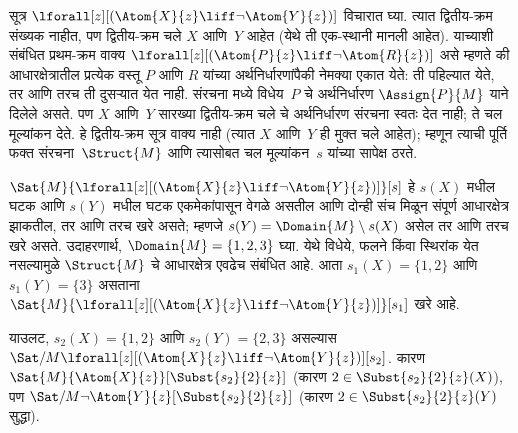 \begin{ex}
  सूत्र
  $\lforall[z][(\Atom{X}{z} \liff \lnot
    \Atom{Y}{z})]$
  विचारात घ्या.
  त्यात द्वितीय-क्रम
  संख्यक नाहीत,
  पण द्वितीय-क्रम
  चले
  $X$ आणि~$Y$
  आहेत (येथे ती
  एक-स्थानी मानली
  आहेत).
  याच्याशी संबंधित
  प्रथम-क्रम
  वाक्य
  $\lforall[z][(\Atom{P}{z} \liff \lnot \Atom{R}{z})]$
  असे म्हणते की
  आधारक्षेत्रातील प्रत्येक वस्तू
  $P$ आणि $R$ यांच्या
  अर्थनिर्धारणांपैकी नेमक्या एकात येते:
  ती पहिल्यात येते, तर आणि तरच
  ती दुसऱ्यात येत नाही.
  संरचना
  मध्ये
  विधेय~$P$
  चे अर्थनिर्धारण
  $\Assign{P}{M}$
  याने दिलेले
  असते. पण
  $X$ आणि~$Y$
  सारख्या द्वितीय-क्रम
  चले
  चे अर्थनिर्धारण
  संरचना
  स्वतः देत नाही;
  ते चल
  मूल्यांकन देते.
  हे द्वितीय-क्रम
  सूत्र
  वाक्य
  नाही (त्यात
  $X$ आणि~$Y$
  ही मुक्त
  चले
  आहेत);
  म्हणून त्याची
  पूर्ति फक्त
  संरचना~$\Struct{M}$
  आणि त्यासोबत
  चल
  मूल्यांकन~$s$
  यांच्या सापेक्ष
  ठरते.

  $\Sat{M}{\lforall[z][(\Atom{X}{z} \liff \lnot \Atom{Y}{z})]}[s]$
  हे $s(X)$ मधील
  घटक आणि $s(Y)$ मधील
  घटक एकमेकांपासून वेगळे असतील
  आणि दोन्ही संच मिळून संपूर्ण आधारक्षेत्र झाकतील,
  तर आणि तरच खरे असते; म्हणजे
  $s(Y) = \Domain{M} \setminus s(X)$
  असेल तर आणि
  तरच खरे असते.
  उदाहरणार्थ,
  $\Domain{M} = \{1, 2, 3\}$
  घ्या.
  येथे विधेये,
  फलने
  किंवा स्थिरांक
  येत नसल्यामुळे
  $\Struct{M}$
  चे आधारक्षेत्र
  एवढेच संबंधित
  आहे.
  आता
  $s_1(X) = \{1, 2\}$
  आणि
  $s_1(Y) = \{3\}$
  असताना
  $\Sat{M}{\lforall[z][(\Atom{X}{z}
      \liff \lnot \Atom{Y}{z})]}[s_1]$
  खरे आहे.

  याउलट,
  $s_2(X) = \{1, 2\}$
  आणि
  $s_2(Y) = \{2, 3\}$
  असल्यास
  $\Sat/{M}{\lforall[z][(\Atom{X}{z} \liff \lnot
      \Atom{Y}{z})]}[s_2]$.
  कारण
  $\Sat{M}{\Atom{X}{z}}[\Subst{s_2}{2}{z}]$
  (कारण
  $2 \in \Subst{s_2}{2}{z}(X)$),
  पण
  $\Sat/{M}{\lnot \Atom{Y}{z}}[\Subst{s_2}{2}{z}]$
  (कारण
  $2 \in
  \Subst{s_2}{2}{z}(Y)$
  सुद्धा).
\end{ex}

